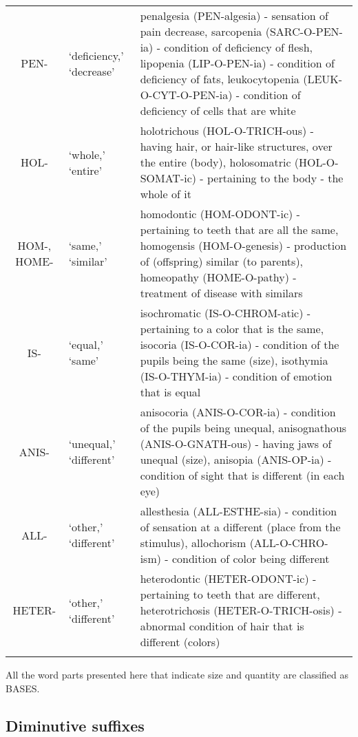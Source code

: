 \begin{longtable}{c | p{} | p{}}
        PEN- & `deficiency,' `decrease' & penalgesia (PEN-algesia) - sensation of pain decrease, sarcopenia (SARC-O-PEN-ia) - condition of deficiency of flesh, lipopenia (LIP-O-PEN-ia) - condition of deficiency of fats, leukocytopenia (LEUK-O-CYT-O-PEN-ia) - condition of deficiency of cells that are white \\
        HOL- & `whole,' `entire' & holotrichous (HOL-O-TRICH-ous) - having hair, or hair-like structures, over the entire (body), holosomatric (HOL-O-SOMAT-ic) - pertaining to the body - the whole of it \\
        HOM-, HOME- & `same,' `similar' & homodontic (HOM-ODONT-ic) - pertaining to teeth that are all the same, homogensis (HOM-O-genesis) - production of (offspring) similar (to parents), homeopathy (HOME-O-pathy) - treatment of disease with similars \\
        IS- & `equal,' `same' & isochromatic (IS-O-CHROM-atic) - pertaining to a color that is the same, isocoria (IS-O-COR-ia) - condition of the pupils being the same (size), isothymia (IS-O-THYM-ia) - condition of emotion that is equal \\
        ANIS- & `unequal,' `different' & anisocoria (ANIS-O-COR-ia) - condition of the pupils being unequal, anisognathous (ANIS-O-GNATH-ous) - having jaws of unequal (size), anisopia (ANIS-OP-ia) - condition of sight that is different (in each eye) \\
        ALL- & `other,' `different' & allesthesia (ALL-ESTHE-sia) - condition of sensation at a different (place from the stimulus), allochorism (ALL-O-CHRO-ism) - condition of color being different \\
        HETER- & `other,' `different' & heterodontic (HETER-ODONT-ic) - pertaining to teeth that are different, heterotrichosis (HETER-O-TRICH-osis) - abnormal condition of hair that is different (colors) \\
    \label{tab:Ch8Base}
\end{longtable}


All the word parts presented here that indicate size and quantity are classified as BASES.

\subsection{Diminutive suffixes}

